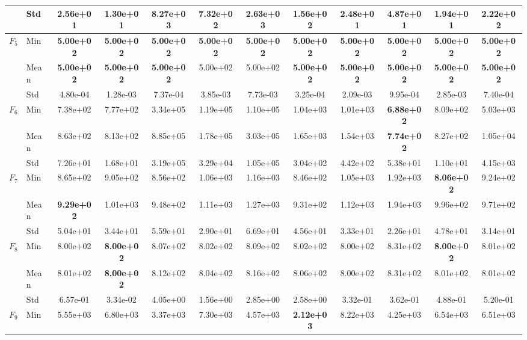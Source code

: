 \begin{center}
\begin{longtable}{clcccccccccc}
 & Std & 2.56e+01 & 1.30e+01 & 8.27e+03 & 7.32e+02 & 2.63e+03 & 1.56e+02 & 2.48e+01 & 4.87e+01 & 1.94e+01 & 2.22e+02 \\
\midrule
\multirow{3}{*}{$F_{5}$} & Min & \textbf{5.00e+02} & \textbf{5.00e+02} & \textbf{5.00e+02} & \textbf{5.00e+02} & \textbf{5.00e+02} & \textbf{5.00e+02} & \textbf{5.00e+02} & \textbf{5.00e+02} & \textbf{5.00e+02} & \textbf{5.00e+02} \\
 & Mean & \textbf{5.00e+02} & \textbf{5.00e+02} & \textbf{5.00e+02} & 5.00e+02 & 5.00e+02 & \textbf{5.00e+02} & \textbf{5.00e+02} & \textbf{5.00e+02} & \textbf{5.00e+02} & \textbf{5.00e+02} \\
 & Std & 4.80e-04 & 1.28e-03 & 7.37e-04 & 3.85e-03 & 7.73e-03 & 3.25e-04 & 2.09e-03 & 9.95e-04 & 2.85e-03 & 7.40e-04 \\
\midrule
\multirow{3}{*}{$F_{6}$} & Min & 7.38e+02 & 7.77e+02 & 3.34e+05 & 1.19e+05 & 1.10e+05 & 1.04e+03 & 1.01e+03 & \textbf{6.88e+02} & 8.09e+02 & 5.03e+03 \\
 & Mean & 8.63e+02 & 8.13e+02 & 8.85e+05 & 1.78e+05 & 3.03e+05 & 1.65e+03 & 1.54e+03 & \textbf{7.74e+02} & 8.27e+02 & 1.05e+04 \\
 & Std & 7.26e+01 & 1.68e+01 & 3.19e+05 & 3.29e+04 & 1.05e+05 & 3.04e+02 & 4.42e+02 & 5.38e+01 & 1.10e+01 & 4.15e+03 \\
\midrule
\multirow{3}{*}{$F_{7}$} & Min & 8.65e+02 & 9.05e+02 & 8.56e+02 & 1.06e+03 & 1.16e+03 & 8.46e+02 & 1.05e+03 & 1.92e+03 & \textbf{8.06e+02} & 9.24e+02 \\
 & Mean & \textbf{9.29e+02} & 1.01e+03 & 9.48e+02 & 1.11e+03 & 1.27e+03 & 9.31e+02 & 1.12e+03 & 1.94e+03 & 9.96e+02 & 9.71e+02 \\
 & Std & 5.04e+01 & 3.44e+01 & 5.59e+01 & 2.90e+01 & 6.69e+01 & 4.56e+01 & 3.33e+01 & 2.26e+01 & 4.78e+01 & 3.14e+01 \\
\midrule
\multirow{3}{*}{$F_{8}$} & Min & 8.00e+02 & \textbf{8.00e+02} & 8.07e+02 & 8.02e+02 & 8.09e+02 & 8.02e+02 & 8.00e+02 & 8.31e+02 & \textbf{8.00e+02} & 8.01e+02 \\
 & Mean & 8.01e+02 & \textbf{8.00e+02} & 8.12e+02 & 8.04e+02 & 8.16e+02 & 8.06e+02 & 8.00e+02 & 8.31e+02 & 8.01e+02 & 8.01e+02 \\
 & Std & 6.57e-01 & 3.34e-02 & 4.05e+00 & 1.56e+00 & 2.85e+00 & 2.58e+00 & 3.32e-01 & 3.62e-01 & 4.88e-01 & 5.20e-01 \\
\midrule
\multirow{3}{*}{$F_{9}$} & Min & 5.55e+03 & 6.80e+03 & 3.37e+03 & 7.30e+03 & 4.57e+03 & \textbf{2.12e+03} & 8.22e+03 & 4.25e+03 & 6.54e+03 & 6.51e+03 \\

\end{longtable}
\end{center}
